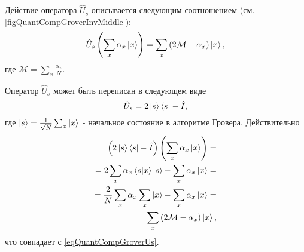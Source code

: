 

Действие оператора $\hat{U}_s$ описывается следующим соотношением
(см. \autoref{figQuantCompGroverInvMiddle}):
\begin{equation}
\hat{U}_s\left(\sum_x \alpha_x \ket{x}\right) = 
\sum_x \left(2 \mathcal{M} - \alpha_x \right)\ket{x},
\label{eqQuantCompGroverUs}
\end{equation} 
где $\mathcal{M} = \sum_x \frac{\alpha_x}{N}$.

Оператор $\hat{U}_s$ может быть переписан в следующем виде
\begin{equation}
\hat{U}_s = 
2 \ket{s}\bra{s} - \hat{I},
\nonumber
\end{equation}
где $\ket{s}=\frac{1}{\sqrt{N}}\sum_x \ket{x}$ -
начальное состояние в алгоритме Гровера.
Действительно
\begin{eqnarray}
\left(2 \ket{s}\bra{s} - \hat{I}\right)
\left(\sum_x \alpha_x \ket{x}\right) =
\nonumber \\
=  2 \sum_x \alpha_x \bra{s}\ket{x} \ket{s} 
- \sum_x \alpha_x \ket{x} = 
\nonumber \\
=
\frac{2}{N} \sum_x \alpha_x \sum_x \ket{x} -
\sum_x \alpha_x \ket{x} = 
\nonumber \\
= \sum_x \left( 2 \mathcal{M} -\alpha_x \right) \ket{x},
\nonumber
\end{eqnarray}
что совпадает с \eqref{eqQuantCompGroverUs}.




